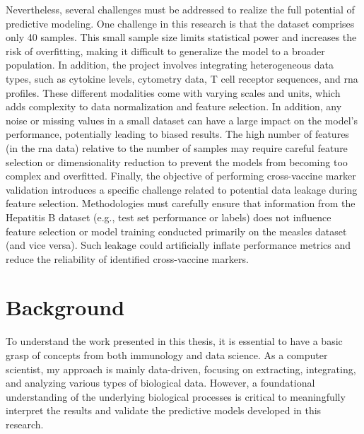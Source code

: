 \documentclass[12pt,a4paper]{report}
\begin{document}
Nevertheless, several challenges must be addressed to realize the full potential of predictive modeling. One challenge in this research is that the dataset comprises only 40 samples. This small sample size limits statistical power and increases the risk of overfitting, making it difficult to generalize the model to a broader population. In addition, the project involves integrating heterogeneous data types, such as cytokine levels, cytometry data, T cell receptor sequences, and \acrshort{rna} profiles. These different modalities come with varying scales and units, which adds complexity to data normalization and feature selection. In addition, any noise or missing values in a small dataset can have a large impact on the model’s performance, potentially leading to biased results. The high number of features (in the \acrshort{rna} data) relative to the number of samples may require careful feature selection or dimensionality reduction to prevent the models from becoming too complex and overfitted. Finally, the objective of performing cross-vaccine marker validation introduces a specific challenge related to potential data leakage during feature selection. Methodologies must carefully ensure that information from the Hepatitis B dataset (e.g., test set performance or labels) does not influence feature selection or model training conducted primarily on the measles dataset (and vice versa). Such leakage could artificially inflate performance metrics and reduce the reliability of identified cross-vaccine markers.





\chapter{Background}
\noindent
To understand the work presented in this thesis, it is essential to have a basic grasp of concepts from both immunology and data science. As a computer scientist, my approach is mainly data-driven, focusing on extracting, integrating, and analyzing various types of biological data. However, a foundational understanding of the underlying biological processes is critical to meaningfully interpret the results and validate the predictive models developed in this research.
\end{document}

